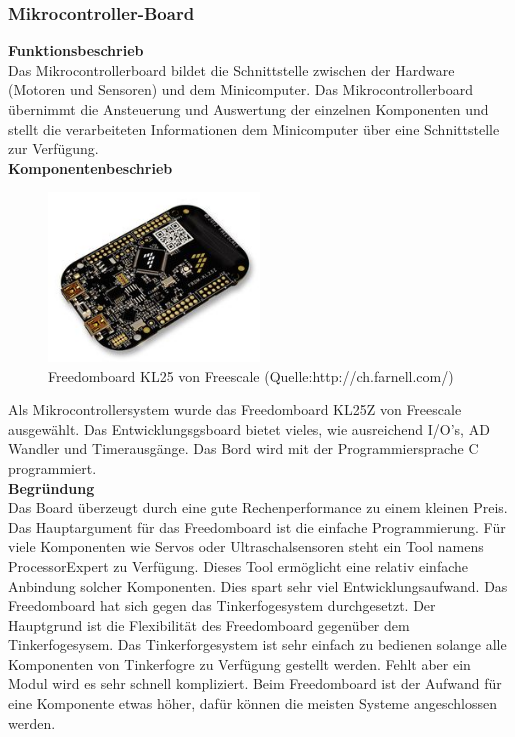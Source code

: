 \subsubsection{Mikrocontroller-Board}
\textbf{Funktionsbeschrieb}\\[0.2cm]
Das Mikrocontrollerboard bildet die Schnittstelle zwischen der Hardware (Motoren und Sensoren) und dem Minicomputer. Das Mikrocontrollerboard übernimmt die Ansteuerung und Auswertung der einzelnen Komponenten und stellt die verarbeiteten Informationen dem Minicomputer über eine Schnittstelle zur Verfügung. \\[0.2cm]
\textbf{Komponentenbeschrieb}\\[0.2cm]
\begin{figure}[H]
	\centering
	\includegraphics[width=0.5\textwidth]{03_Loesungskonzept/pictures/freedomboard.png}
	\caption{Freedomboard KL25 von Freescale (Quelle:http://ch.farnell.com/)}
\end{figure}\flushleft
Als Mikrocontrollersystem wurde das Freedomboard KL25Z von Freescale ausgewählt. Das Entwicklungsgsboard bietet vieles, wie ausreichend I/O's, AD Wandler und Timerausgänge. Das Bord wird mit der Programmiersprache C programmiert. \\[0.2cm]
\textbf{Begründung}\\[0.2cm]
Das Board überzeugt durch eine gute Rechenperformance zu einem kleinen Preis. Das Hauptargument für das Freedomboard ist die einfache Programmierung. Für viele Komponenten wie Servos oder Ultraschalsensoren steht ein Tool namens ProcessorExpert zu Verfügung. Dieses Tool ermöglicht eine relativ einfache Anbindung solcher Komponenten. Dies spart sehr viel Entwicklungsaufwand.
Das Freedomboard hat sich gegen das Tinkerfogesystem durchgesetzt. Der Hauptgrund ist die Flexibilität des Freedomboard gegenüber dem Tinkerfogesysem. Das Tinkerforgesystem ist sehr einfach zu bedienen solange alle Komponenten von Tinkerfogre zu Verfügung gestellt werden. Fehlt aber ein Modul wird es sehr schnell kompliziert. Beim Freedomboard ist der Aufwand für eine Komponente etwas höher, dafür können die meisten Systeme angeschlossen werden.\\[0.2cm]
